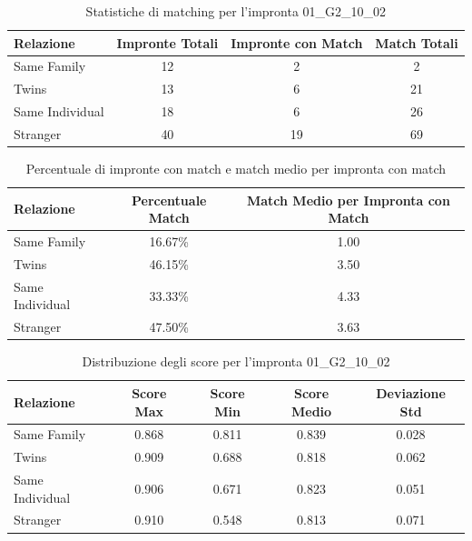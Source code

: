 \begin{table}[htbp]
\centering
\caption{Statistiche di matching per l'impronta 01\_G2\_10\_02}
\label{tab:results_01_G2_10_02}
\begin{tabular}{|l|c|c|c|}
\hline
\textbf{Relazione} & \textbf{Impronte Totali} & \textbf{Impronte con Match} & \textbf{Match Totali} \\
\hline
Same Family & 12 & 2 & 2 \\
\hline
Twins & 13 & 6 & 21 \\
\hline
Same Individual & 18 & 6 & 26 \\
\hline
Stranger & 40 & 19 & 69 \\
\hline
\end{tabular}
\end{table}


\begin{table}[htbp]
\centering
\caption{Percentuale di impronte con match e match medio per impronta con match}
\label{tab:match_percentage_01_G2_10_02}
\begin{tabular}{|l|c|c|}
\hline
\textbf{Relazione} & \textbf{Percentuale Match} & \textbf{Match Medio per Impronta con Match} \\
\hline
Same Family & 16.67\% & 1.00 \\
\hline
Twins & 46.15\% & 3.50 \\
\hline
Same Individual & 33.33\% & 4.33 \\
\hline
Stranger & 47.50\% & 3.63 \\
\hline
\end{tabular}
\end{table}


\begin{table}[htbp]
\centering
\caption{Distribuzione degli score per l'impronta 01\_G2\_10\_02}
\label{tab:scores_01_G2_10_02}
\begin{tabular}{|l|c|c|c|c|}
\hline
\textbf{Relazione} & \textbf{Score Max} & \textbf{Score Min} & \textbf{Score Medio} & \textbf{Deviazione Std} \\
\hline
Same Family & 0.868 & 0.811 & 0.839 & 0.028 \\
\hline
Twins & 0.909 & 0.688 & 0.818 & 0.062 \\
\hline
Same Individual & 0.906 & 0.671 & 0.823 & 0.051 \\
\hline
Stranger & 0.910 & 0.548 & 0.813 & 0.071 \\
\hline
\end{tabular}
\end{table}

